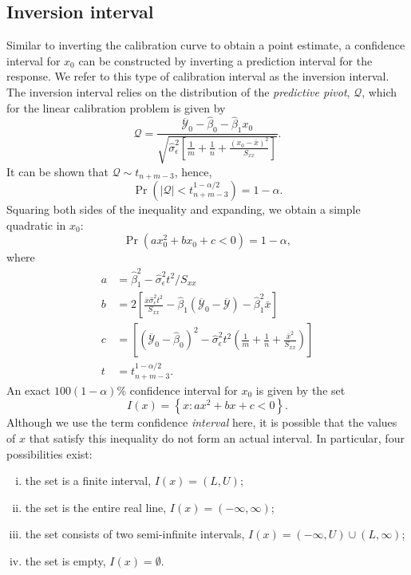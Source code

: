 \documentclass[cmfont,usenames,dvipsnames,leqno]{afit-etd}\usepackage[]{graphicx}\usepackage[]{color}
\newcommand{\mc}[1]{\ensuremath{\mathcal{#1}}}
\newcommand{\wh}[1]{\ensuremath{\widehat{#1}}}
\newcommand{\wb}[1]{\ensuremath{\overline{#1}}}
\newcommand{\Prob}{\operatorname{Pr}}
\begin{document}
\subsection{Inversion interval}
\label{sec:inversion-interval}
Similar to inverting the calibration curve to obtain a point estimate, a confidence interval for $x_0$ can be constructed by inverting a prediction interval for the response. We refer to this type of calibration interval as the inversion interval. The inversion interval relies on the distribution of the \textit{predictive pivot}, $\mc{Q}$, which for the linear calibration problem is given by
\begin{equation}
\label{eqn:predictive-pivot}
  \mc{Q} = \frac{\wb{\mc{Y}}_0-\wh{\beta}_0-\wh{\beta}_1 x_0}{\sqrt{\wh{\sigma}_\epsilon^2\left[\frac{1}{m}+\frac{1}{n}+\frac{(x_0-\bar{x})^2}{S_{xx}}\right]}}.
\end{equation}
It can be shown \citep{graybill_theory_1976} that $\mc{Q} \sim t_{n+m-3}$, hence, 
\begin{equation*}
  \Prob\left(|\mc{Q}| < t_{n+m-3}^{1-\alpha/2}\right) = 1 - \alpha. 
\end{equation*}
Squaring both sides of the inequality and expanding, we obtain a simple quadratic in $x_0$:
\begin{equation}
\label{eqn:quadratic}
  \Prob\left( a x_0^2 + b x_0 + c < 0 \right) = 1 - \alpha,
\end{equation}
where 
\begin{align*}
  a &= \wh{\beta}_1^2-\wh{\sigma}_\epsilon^2 t^2/S_{xx} \\
  b &= 2\left[\frac{\bar{x}\wh{\sigma}_\epsilon^2 t^2}{S_{xx}}-\wh{\beta}_1\left(\wb{\mc{Y}}_0-\wb{\mc{Y}}\right)-\wh{\beta}_1^2\bar{x}\right] \\
  c &= \left[\left(\wb{\mc{Y}}_0-\wh{\beta}_0\right)^2-\wh{\sigma}_\epsilon^2 t^2\left(\frac{1}{m}+\frac{1}{n}+\frac{\bar{x}^2}{S_{xx}}\right)\right] \\
  t &= t_{n+m-3}^{1-\alpha/2}.
\end{align*}
An exact $100(1 - \alpha)\%$ confidence interval for $x_0$ is given by the set
\begin{equation}
\label{eqn:quadratic-inequality}
  I(x) = \left\{x: a x^2 + b x + c < 0 \right\}.
\end{equation}
Although we use the term confidence \emph{interval} here, it is possible that the values of $x$ that satisfy this inequality do not form an actual interval. In particular, four possibilities exist: 
\begin{enumerate}[(i)]
  \item the set is a finite interval, $I(x) = (L, U)$; 
  \item the set is the entire real line, $I(x) = (-\infty, \infty)$; 
  \item the set consists of two semi-infinite intervals, $I(x) = (-\infty, U) \cup (L, \infty)$; 
  \item the set is empty, $I(x) = \emptyset$. 
\end{enumerate}
\end{document}
